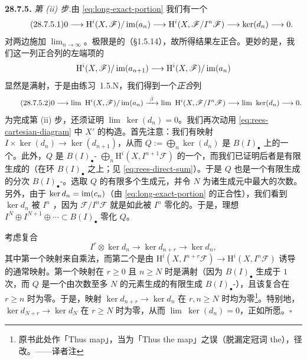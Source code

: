 \textbf{28.7.5.} \emph{第 (ii) 步.}\quad 由 \eqref{eq:long-exact-portion} 我们有一个\trShortExactSequence
\begin{equation*}
\tag{28.7.5.1}\label{eq:ses-im-an}
0\longrightarrow\mathrm{H}^i(X,\mathscr{F})/\operatorname{im}(a_n)\longrightarrow\mathrm{H}^i(X,\mathscr{F}/I^n\mathscr{F})\longrightarrow\ker(d_n)\longrightarrow 0.
\end{equation*}
对两边施加 $\lim_{n\to\infty}$。极限是\trLeftExact{}的（\S1.5.14），故所得结果左正合。更妙的是，我们这一列正合列的左端项的\trTransitionMap
\[
\mathrm{H}^i(X,\mathscr{F})/\operatorname{im}(a_{n+1})\longrightarrow\mathrm{H}^i(X,\mathscr{F})/\operatorname{im}(a_n)
\]
显然是满射，于是由\mbox{练习~1.5.N}，我们得到一个\emph{正合}列
\begin{equation*}
\tag{28.7.5.2}\label{eq:limit-ses-kernel}
0\longrightarrow\lim\ \mathrm{H}^i(X,\mathscr{F})/\im(a_n)\xrightarrow{\ \beta\ }\lim\ \mathrm{H}^i(X,\mathscr{F}/I^n\mathscr{F})\longrightarrow\lim\ \ker(d_n)\longrightarrow 0.
\end{equation*}
为完成第 (ii) 步，还须证明 $\lim\ \ker(d_n)=0$。我们再次动用 \eqref{eq:rees-cartesian-diagram} 中 $X'$ 的构造。首先注意：我们有映射 $I\times\ker(d_n)\to\ker(d_{n+1})$，从而 $Q:=\bigoplus_n\ker(d_n)$ 是 $B(I)_\bullet$ 上的一个\trModule。此外，$Q$ 是 $B(I)_\bullet$-\trModule{} $\bigoplus_n\mathrm{H}^i(X,I^{n+1}\mathscr{F})$ 的一个\trSubmodule，而我们已证明后者是有限生成的（在\trNoether{}环 $B(I)_\bullet$ 之上；见 \eqref{eq:rees-direct-sum}）。于是 $Q$ 也是一个有限生成的分次 $B(I)_\bullet$-\trModule。选取 $Q$ 的有限多个\trHomogeneous{}生成元，并令 $N$ 为诸生成元中最大的次数。另外，由于 $\ker d_n=\operatorname{im}(c_n)$（由 \eqref{eq:long-exact-portion} 的正合性），我们看到 $\ker d_n$ 被 $I^n$ \trAnnihilate，因为 $\mathscr{F}/I^n\mathscr{F}$ 就是如此被 $I^n$ 零化的。于是，理想 $I^N\oplus I^{N+1}\oplus\cdots\subset B(I)_\bullet$ 零化 $Q$。

考虑复合
\[
I^r\otimes\ker d_n\longrightarrow\ker d_{n+r}\longrightarrow\ker d_n,
\]
其中第一个映射来自乘法，而第二个是由 $\mathrm{H}^i(X,I^{n+r}\mathscr{F})\to\mathrm{H}^i(X,I^n\mathscr{F})$ 诱导的通常映射。第一个映射在 $r\ge 0$ 且 $n\ge N$ 时是满射（因为 $B(I)_\bullet$ 生成于 $1$ 次，而 $Q$ 是一个由次数至多 $N$ 的元素生成的有限生成 $B(I)_\bullet$-\trModule），且该复合在 $r\ge n$ 时为零。于是，映射 $\ker d_{n+r}\to\ker d_n$ 在 $r,n\ge N$ 时均为零\footnote{原书此处作「Thus map」，当为「Thus the map」之误（脱漏定冠词 the），径改。——译者注}。特别地，$\ker d_{N+r}\to\ker d_N$ 在 $r\ge N$ 时为零，从而 $\lim\ \ker(d_n)=0$，正如所愿。\hfill$\square$

